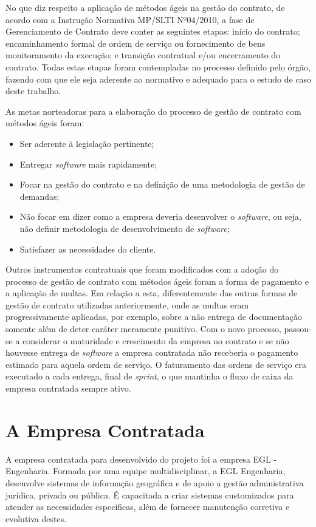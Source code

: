 No que diz respeito a aplicação de métodos ágeis na gestão do contrato, de acordo com a Instrução Normativa MP/SLTI Nº04/2010, a fase de Gerenciamento de Contrato deve conter as seguintes etapas: início do contrato; encaminhamento formal de ordem de serviço ou fornecimento de bens  monitoramento da execução; e transição contratual e/ou encerramento do contrato. Todas estas etapas foram contempladas no processo definido pelo órgão, fazendo com que ele seja aderente ao normativo e adequado para o estudo de caso deste trabalho.

As metas norteadoras para a elaboração do processo de gestão de contrato com métodos ágeis foram:
\begin{itemize}
\item Ser aderente à legislação pertinente;
\item Entregar \textit{software} mais rapidamente;
\item Focar na gestão do contrato e na definição de uma metodologia de gestão de demandas;
\item Não focar em dizer como a empresa deveria desenvolver o \textit{software}, ou seja, não definir metodologia de desenvolvimento de \textit{software};
\item Satisfazer as necessidades do cliente.
\end{itemize}

Outros instrumentos contratuais que foram modificados com a adoção do processo de gestão de contrato com métodos ágeis foram a forma de pagamento e a aplicação de multas. Em relação a esta, diferentemente das outras formas de gestão de contrato utilizadas anteriormente, onde as multas eram progressivamente aplicadas, por exemplo, sobre a não entrega de documentação somente além de deter caráter meramente punitivo. Com o novo processo, passou-se a considerar o maturidade e crescimento da empresa no contrato e  se não houvesse entrega de \textit{software} a empresa contratada não receberia o pagamento estimado para aquela ordem de serviço. O faturamento das ordens de serviço era executado a cada entrega, final de \textit{sprint}, o que mantinha o fluxo de caixa da empresa contratada sempre ativo. 


\section[A Empresa Contratada]{A Empresa Contratada}

A empresa contratada para desenvolvido do projeto foi a empresa EGL - Engenharia. Formada por uma equipe multidisciplinar, a EGL Engenharia, desenvolve sistemas de informação geográfica e de apoio a gestão administrativa jurídica, privada ou pública. É capacitada a criar sistemas customizados para atender as necessidades especificas, além de fornecer manutenção corretiva e evolutiva destes.

